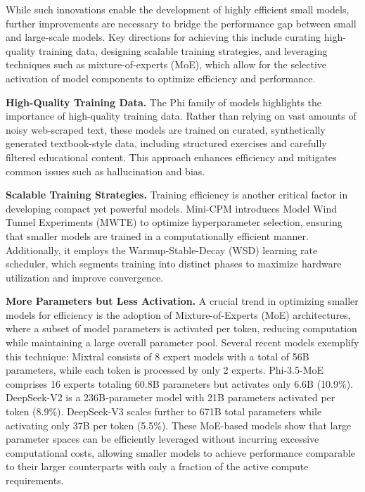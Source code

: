     While such innovations enable the development of highly efficient small models, further improvements are necessary to bridge the performance gap between small and large-scale models. Key directions for achieving this include curating high-quality training data, designing scalable training strategies, and leveraging techniques such as mixture-of-experts (MoE), which allow for the selective activation of model components to optimize efficiency and performance.

    \textbf{High-Quality Training Data.}
    The Phi family of models \cite{gunasekar2023textbooks, li2023textbooks, javaheripi2023phi, abdin2024phi} highlights the importance of high-quality training data. Rather than relying on vast amounts of noisy web-scraped text, these models are trained on curated, synthetically generated textbook-style data, including structured exercises and carefully filtered educational content. This approach enhances efficiency and mitigates common issues such as hallucination and bias.

    \textbf{Scalable Training Strategies.}
    Training efficiency is another critical factor in developing compact yet powerful models. Mini-CPM \cite{hu2024minicpm} introduces Model Wind Tunnel Experiments (MWTE) to optimize hyperparameter selection, ensuring that smaller models are trained in a computationally efficient manner. Additionally, it employs the Warmup-Stable-Decay (WSD) learning rate scheduler, which segments training into distinct phases to maximize hardware utilization and improve convergence.
    
    \textbf{More Parameters but Less Activation.}
    A crucial trend in optimizing smaller models for efficiency is the adoption of Mixture-of-Experts (MoE) architectures, where a subset of model parameters is activated per token, reducing computation while maintaining a large overall parameter pool. Several recent models exemplify this technique:
    Mixtral \cite{jiang2024mixtral} consists of 8 expert models with a total of 56B parameters, while each token is processed by only 2 experts.
    Phi-3.5-MoE \cite{abdin2024phi} comprises 16 experts totaling 60.8B parameters but activates only 6.6B (10.9\%).
    DeepSeek-V2 \cite{liu2024deepseek} is a 236B-parameter model with 21B parameters activated per token (8.9\%).
    DeepSeek-V3 \cite{liu2024deepseek3} scales further to 671B total parameters while activating only 37B per token (5.5\%).
    These MoE-based models show that large parameter spaces can be efficiently leveraged without incurring excessive computational costs, allowing smaller models to achieve performance comparable to their larger counterparts with only a fraction of the active compute requirements.
    
